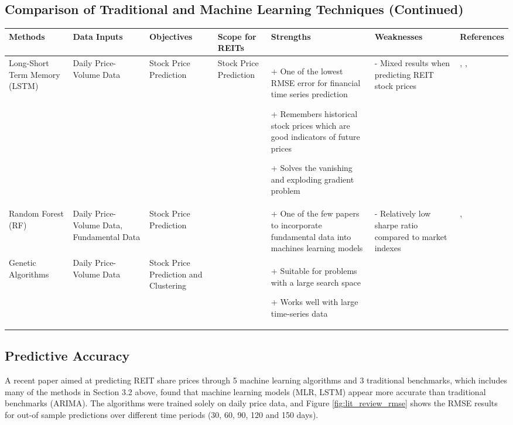\documentclass[a4paper,12pt]{report}
\numberwithin{equation}{section}
\theoremstyle{definition}
\begin{document}
\begin{landscape}
  \section{Comparison of Traditional and Machine Learning Techniques (Continued)}
  \begin{table}[H]
    \begin{adjustwidth}{-1.9cm}{-1.9cm}
    \begin{tabular}{|p{2.6cm}|p{2.7cm}|p{2.7cm}|p{3.5cm}|p{5cm}|p{5cm}|p{4cm}|}
    \hline
    \textbf{Methods} & \textbf{Data Inputs} & \textbf{Objectives} & \textbf{Scope for REITs} & \textbf{Strengths} & \textbf{Weaknesses} & \textbf{References}  
    \\ \hline Long-Short Term Memory (LSTM) & Daily Price-Volume Data & Stock Price Prediction & Stock Price Prediction & + One of the lowest RMSE error for financial time series prediction \par+ Remembers historical stock prices which are good indicators of future prices \par+ Solves the vanishing and exploding gradient problem & - Mixed results when predicting REIT stock prices & \cite{axelsson_univariate_2023},   \cite{habbab_machine_2022}, \cite{obthong_survey_2020} 
    \\ \hline Random Forest (RF) & Daily Price-Volume Data, Fundamental Data & Stock Price Prediction & & + One of the few papers to incorporate fundamental data into machines learning models & - Relatively low sharpe ratio compared to market indexes & \cite{cao_fundamental_2021},   \cite{huang_machine_2021}  
    \\ \hline Genetic Algorithms & Daily Price-Volume Data & Stock Price Prediction and Clustering & & + Suitable for problems with a large search space \par+ Works well with large time-series data & & \cite{obthong_survey_2020}
    \\ \hline
    \end{tabular}
  \end{adjustwidth}
  \end{table}



  
\end{landscape}



\subsection{Predictive Accuracy}
A recent paper aimed at predicting REIT share prices through 5 machine learning algorithms and 3 traditional benchmarks, which includes many of the methods in Section 3.2 above, found that machine learning models (MLR, LSTM) appear more accurate than traditional benchmarks (ARIMA). The algorithms were trained solely on daily price data, and Figure \ref{fig:lit_review_rmse} shows the RMSE results for out-of sample predictions over different time periods (30, 60, 90, 120 and 150 days).
\end{document}
